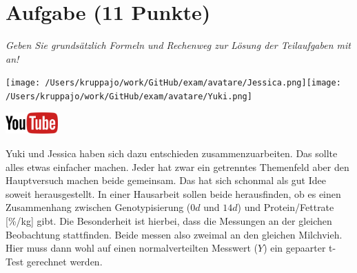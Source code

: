 \documentclass[a4paper, 9pt]{scrartcl}\usepackage[]{graphicx}\usepackage[]{xcolor}
\begin{document}
\section{Aufgabe \hfill (11 Punkte)}

\textit{Geben Sie grundsätzlich Formeln und Rechenweg zur Lösung der Teilaufgaben mit an!} \\[1Ex]
 

 
\begin{minipage}[t]{0.5\textwidth}
\texttt{[image: /Users/kruppajo/work/GitHub/exam/avatare/Jessica.png]}\hspace{-4mm}\texttt{[image: /Users/kruppajo/work/GitHub/exam/avatare/Yuki.png]}
\end{minipage}
\begin{minipage}[t]{0.5\textwidth}
\hfill
\href{https://youtu.be/QR90zyn0Iz8}{\includegraphics[width = 2cm]{img/youtube}}
\end{minipage}
\vspace{1ex}



Yuki und Jessica haben sich dazu entschieden zusammenzuarbeiten. Das sollte alles etwas einfacher machen. Jeder hat zwar ein getrenntes Themenfeld aber den Hauptversuch machen beide gemeinsam. Das hat sich schonmal als gut Idee soweit herausgestellt. In einer Hausarbeit sollen beide herausfinden, ob es einen Zusammenhang zwischen Genotypisierung ($0d$ und $14d$) und Protein/Fettrate [\%/kg] gibt. Die Besonderheit ist hierbei, dass die Messungen an der gleichen Beobachtung stattfinden. Beide messen also zweimal an den gleichen Milchvieh. Hier muss dann wohl auf einen normalverteilten Messwert ($Y$) ein gepaarter t-Test gerechnet werden.
\end{document}
